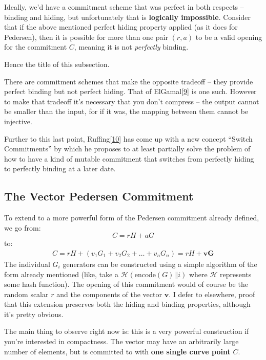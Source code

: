 \documentclass[10pt,a4paper]{article}
\begin{document}
Ideally, we'd have a commitment scheme that was perfect in both respects
-- binding and hiding, but unfortunately that is \textbf{logically
impossible}. Consider that if the above mentioned perfect hiding
property applied (as it does for Pedersen), then it is possible for more
than one pair $(r, a)$ to be a valid opening for the commitment $C$, meaning it is
not \emph{perfectly} binding.

Hence the title of this subsection.

There are commitment schemes that make the opposite tradeoff -- they
provide perfect binding but not perfect hiding. That of
ElGamal{[}\protect\hyperlink{anchor-20}{9}{]} is one such. However to
make that tradeoff it's necessary that you don't compress -- the output
cannot be smaller than the input, for if it was, the mapping between
them cannot be injective.

Further to this last point,
Ruffing{[}\protect\hyperlink{anchor-21}{10}{]} has come up with a new
concept ``Switch Commitments'' by which he proposes to at least
partially solve the problem of how to have a kind of mutable commitment
that switches from perfectly hiding to perfectly binding at a later
date.

\hypertarget{the-vector-pedersen-commitment}{%
\subsection[The Vector Pedersen
Commitment]{\texorpdfstring{\protect\hypertarget{anchor-22}{}{}The
Vector Pedersen Commitment}{The Vector Pedersen Commitment}}\label{the-vector-pedersen-commitment}}

To extend to a more powerful form of the Pedersen commitment already
defined, we go from:
\[C = rH + aG\]
to:
\begin{align}
C = rH + (v_1G_1 + v_2G_2 + \ldots + v_nG_n) = rH + \textbf{vG} \label{vector-pedersen-commitment-def:1} 
\end{align}
The individual $G_i$ generators can be constructed using a simple algorithm of the form
already mentioned (like, take a $\mathcal{H}(\textrm{encode}(G)||i)$  where $\mathcal{H}$ represents some hash function).
The opening of this commitment would of course be the random scalar $r$ and
the components of the vector $\textbf{v}$. I defer to elsewhere, proof
that this extension preserves both the hiding and binding properties,
although it's pretty obvious.

The main thing to observe right now is: this is a very powerful
construction if you're interested in compactness. The vector may have an
arbitrarily large number of elements, but is committed to with
\textbf{one single curve point} $C$.
\end{document}
